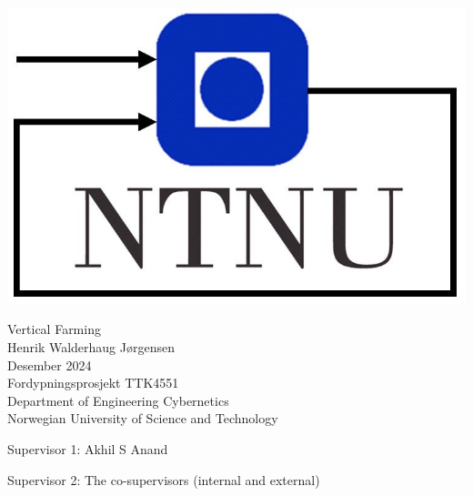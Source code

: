 
\thispagestyle{empty}
\includegraphics[scale=0.3]{fig/itk_ntnu.jpg}
\mbox{}\\[6pc]
\begin{center}
\Huge{Vertical Farming}\\[2pc]

\Large{Henrik Walderhaug Jørgensen}\\[1pc]
\large{Desember 2024}\\[2pc]

Fordypningsprosjekt TTK4551\\
Department of Engineering Cybernetics\\
Norwegian University of Science and Technology
\end{center}
\vfill

\noindent Supervisor 1: Akhil S Anand

\noindent Supervisor 2: The co-supervisors (internal and external)

